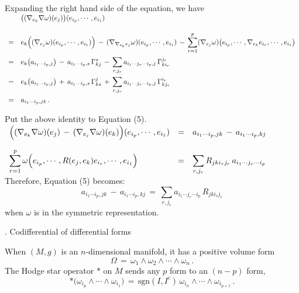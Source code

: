 \documentclass{article}[12pt,a4paper]
\begin{document}
Expanding the right hand side of the equation, we have \\[0.1in]
$\begin{array}{rl}
& \displaystyle \big((\nabla_{e_k} \nabla\omega)(e_j)\big)(e_{i_p}, \cdots, e_{i_1}) \\[0.2in]
=& \displaystyle 
	e_k\Big((\nabla_{e_j}\omega)(e_{i_p}, \cdots, e_{i_1})\Big)
	\,-\,(\nabla_{\nabla_{e_k}e_j}\omega) (e_{i_p}, \cdots, e_{i_1}) 
	\,-\, \sum_{r=1}^p (\nabla_{e_j}\omega)\big(e_{i_p}, \cdots, \nabla_{e_k} e_{i_r}, \cdots, e_{i_1}\big) \\[0.2in]
=& \displaystyle 
	e_k\big(a_{i_1\cdots i_p, j}\big) \,-\, a_{i_1 \cdots i_p,s}\,\Gamma_{kj}^s 
	\,-\, \sum_{r, j_r} a_{i_1\cdots j_r \cdots i_p, j} \, \Gamma_{k i_r}^{j_r} \\[0.2in]
=& \displaystyle 
	e_k\big(a_{i_1\cdots i_p, j}\big) \,+\, a_{i_1 \cdots i_p,s}\,\Gamma_{ks}^j
	\,+\, \sum_{r, j_r} a_{i_1\cdots j_r \cdots i_p, j} \, \Gamma_{k j_r}^{i_r} \\[0.2in]
=& \displaystyle 
	a_{i_1\cdots i_p, jk} \,.
\end{array}$ \\
\newpage

Put the above identity to Equation (5). \\[0.1in]
$\begin{array}{lcl}
\Big((\nabla_{e_k} \nabla \omega)(e_j) \,-\, (\nabla_{e_j} \nabla \omega)(e_k)\Big)(e_{i_p}, \cdots, e_{i_1})
&=& \ds a_{i_1\cdots i_p, jk} \,-\, a_{i_1\cdots i_p, kj} \\[0.2in]
% 
\ds \sum_{r=1}^p \omega\Big(e_{i_p}, \cdots, R(e_j,e_k)e_{i_r}, \cdots, e_{i_1}\Big) 
&=& \ds
	\sum_{r, j_r} R_{jk i_r j_r}\, a_{i_1\cdots j_r\cdots i_p} \\ 
\end{array} $\\[0.1in]

Therefore, Equation (5) becomes: 
\begin{equation}
a_{i_1\cdots i_p, jk} \,-\, a_{i_1\cdots i_p, kj} \,=\, \sum_{r, j_r} a_{i_1\cdots j_r\cdots i_p} \, R_{jk i_r j_r}
\end{equation}
when $\omega$ is in the symmetric representation. \\
\vspace*{0.2in}


\begin{center} {. Codifferential of differential forms}\end{center}
When $(M,g)$ is an $n$-dimensional manifold, it has a positive volume form
$$ \Omega \,=\, \omega_1 \wedge \omega_2 \wedge \cdots \wedge \omega_n\,. $$ 
The Hodge star operator $\ast$ on $M$ sends any $p$ form to an $(n-p)$ form, 
$$ \ast\big(\omega_{i_p} \wedge \cdots \wedge \omega_{i_1}\big) 
\,=\, \mbox{sgn}(I, I^c) \, \omega_{i_n} \wedge \cdots \wedge \omega_{i_{p+1}}\,. $$
\end{document}
